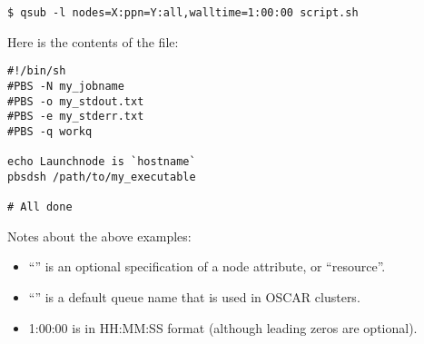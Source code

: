 \begin{verbatim}
$ qsub -l nodes=X:ppn=Y:all,walltime=1:00:00 script.sh
\end{verbatim}

Here is the contents of the  file:

\begin{verbatim}
#!/bin/sh
#PBS -N my_jobname
#PBS -o my_stdout.txt
#PBS -e my_stderr.txt
#PBS -q workq

echo Launchnode is `hostname`
pbsdsh /path/to/my_executable

# All done
\end{verbatim}

Notes about the above examples:
\begin{itemize}
\item``'' is an optional specification of a node attribute,
  or ``resource''.

\item ``'' is a default queue name that is used in OSCAR
  clusters.

\item 1:00:00 is in HH:MM:SS format (although leading zeros are optional).

\end{itemize}

